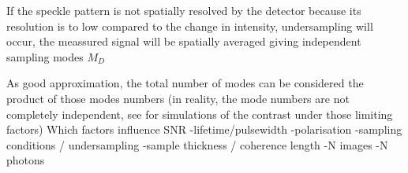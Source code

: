 If the speckle pattern is not spatially resolved by the detector because its resolution is to low compared to the change in intensity, undersampling will occur, the meassured signal will be spatially averaged giving independent sampling modes $M_D$





As good approximation, the total number of modes can be considered the product of those modes numbers (in reality, the mode numbers are not completely independent, see  for simulations of the contrast under those limiting factors)
Which factors influence SNR
-lifetime/pulsewidth
-polarisation
-sampling conditions / undersampling
-sample thickness / coherence length
-N images
-N photons
\label{chap:theory}


